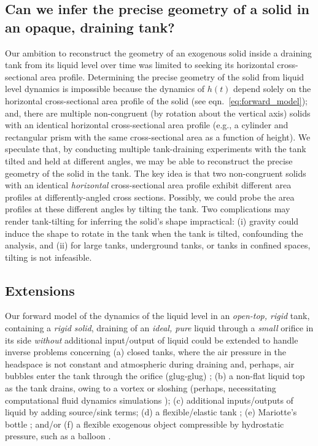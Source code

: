 \documentclass[a4paper,fleqn]{cas-dc}
\begin{document}
\subsection{Can we infer the precise geometry of a solid in an opaque, draining tank?}
Our ambition to reconstruct the geometry of an exogenous solid inside a draining tank from its liquid level over time was limited to seeking its horizontal cross-sectional area profile.
Determining the precise geometry of the solid from liquid level dynamics is impossible because the dynamics of $h(t)$ depend solely on the horizontal cross-sectional area profile of the solid (see eqn.~\ref{eq:forward_model}); and, there are multiple non-congruent (by rotation about the vertical axis) solids with an identical horizontal cross-sectional area profile (e.g., a cylinder and rectangular prism with the same cross-sectional area as a function of height). We speculate that, by conducting multiple tank-draining experiments with the tank tilted and held at different angles, we may be able to reconstruct the precise geometry of the solid in the tank. The key idea is that two non-congruent solids with an identical \emph{horizontal} cross-sectional area profile exhibit different area profiles at differently-angled cross sections.
Possibly, we could probe the area profiles at these different angles by tilting the tank. 
Two complications may render tank-tilting for inferring the solid's shape impractical: 
(i) gravity could induce the shape to rotate in the tank when the tank is tilted, confounding the analysis, and (ii) for large tanks, underground tanks, or tanks in confined spaces, tilting is not infeasible. 

\subsection{Extensions}
Our forward model of the dynamics of the liquid level in an \emph{open-top, rigid} tank, containing a \emph{rigid solid}, draining of an \emph{ideal, pure} liquid through a \emph{small} orifice in its side \emph{without} additional input/output of liquid could be extended to handle inverse problems concerning
(a) closed tanks, where the air pressure in the headspace is not constant and atmospheric during draining \cite{cross2016filling} and, perhaps, air bubbles enter the tank through the orifice (glug-glug) \cite{mayer2019bottle,clanet2004glug}; 
(b) a non-flat liquid top as the tank drains, owing to a vortex \cite{caquas2023bathtub} or sloshing \cite{ibrahim2005liquid} (perhaps, necessitating computational fluid dynamics simulations \cite{mathew2014numerical,sakri2017numerical});
(c) additional inputs/outputs of liquid by adding source/sink terms; 
(d) a flexible/elastic tank \cite{velankar2024soft};
(e) Mariotte's bottle \cite{kirevs2006mariotte}; and/or
(f) a flexible exogenous object compressible by hydrostatic pressure, such as a balloon \cite{muller2004rubber}. 
\end{document}
